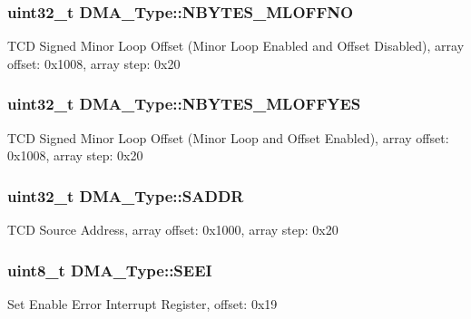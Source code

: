 \subsubsection[{\texorpdfstring{N\+B\+Y\+T\+E\+S\+\_\+\+M\+L\+O\+F\+F\+NO}{NBYTES_MLOFFNO}}]{ uint32\+\_\+t D\+M\+A\+\_\+\+Type\+::\+N\+B\+Y\+T\+E\+S\+\_\+\+M\+L\+O\+F\+F\+NO}\hypertarget{structDMA__Type_a6b8476054f058853f49a684ece742f88}{}\label{structDMA__Type_a6b8476054f058853f49a684ece742f88}
T\+CD Signed Minor Loop Offset (Minor Loop Enabled and Offset Disabled), array offset\+: 0x1008, array step\+: 0x20 
\subsubsection[{\texorpdfstring{N\+B\+Y\+T\+E\+S\+\_\+\+M\+L\+O\+F\+F\+Y\+ES}{NBYTES_MLOFFYES}}]{ uint32\+\_\+t D\+M\+A\+\_\+\+Type\+::\+N\+B\+Y\+T\+E\+S\+\_\+\+M\+L\+O\+F\+F\+Y\+ES}\hypertarget{structDMA__Type_a5e0642c17b40d3ff9a5be9d5ba36ed22}{}\label{structDMA__Type_a5e0642c17b40d3ff9a5be9d5ba36ed22}
T\+CD Signed Minor Loop Offset (Minor Loop and Offset Enabled), array offset\+: 0x1008, array step\+: 0x20 
\subsubsection[{\texorpdfstring{S\+A\+D\+DR}{SADDR}}]{ uint32\+\_\+t D\+M\+A\+\_\+\+Type\+::\+S\+A\+D\+DR}\hypertarget{structDMA__Type_aa1626bb4b8a54b48a89d0a1b8c022c05}{}\label{structDMA__Type_aa1626bb4b8a54b48a89d0a1b8c022c05}
T\+CD Source Address, array offset\+: 0x1000, array step\+: 0x20 
\subsubsection[{\texorpdfstring{S\+E\+EI}{SEEI}}]{ uint8\+\_\+t D\+M\+A\+\_\+\+Type\+::\+S\+E\+EI}\hypertarget{structDMA__Type_aa3c87cb018aa5aa7f1cd627b3ffad941}{}\label{structDMA__Type_aa3c87cb018aa5aa7f1cd627b3ffad941}
Set Enable Error Interrupt Register, offset\+: 0x19 
